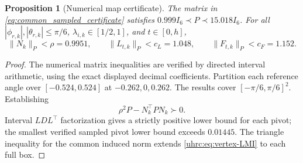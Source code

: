 \documentclass[12pt, a4paper]{article}
\newtheorem{proposition}{Proposition}
\begin{document}
\begin{proposition}[Numerical map certificate]
\label{uhrc:prop:common}
The matrix in \eqref{eq:common_sampled_certificate} satisfies
$0.999I_6\prec P\prec15.018I_6$. For all
$|\phi_{r,k}|,|\theta_{r,k}|\le\pi/6$,
$\lambda_{i,k}\in[1/2,1]$, and $t\in[0,h]$,
\begin{equation}
 \|N_k\|_P<\rho=0.9951,\qquad
 \|L_{t,k}\|_P<c_L=1.048,\qquad
 \|F_{t,k}\|_P<c_F=1.152.
 \label{eq:common_contraction}
\end{equation}
\end{proposition}
\begin{proof}
The numerical matrix inequalities are verified by directed interval
arithmetic, using the exact displayed decimal coefficients. Partition each
reference angle over $[-0.524,0.524]$ at $-0.262,0,0.262$.
The results cover $[-\pi/6,\pi/6]^2$. Establishing
\begin{equation}
 \rho^2P-N_k^\top PN_k\succ0.
 \label{uhrc:eq:vertex-LMI}
\end{equation}
Interval $LDL^\top$ factorization gives a strictly positive lower bound for
each pivot; the smallest verified sampled pivot lower bound exceeds
$0.01445$. The triangle inequality for the common induced norm extends
\eqref{uhrc:eq:vertex-LMI} to each full box. 


\end{proof}
\end{document}
